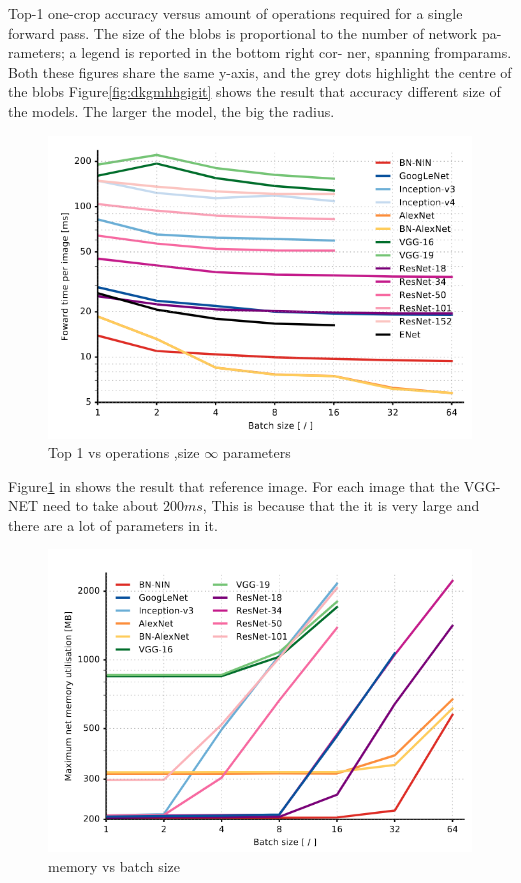 \documentclass[10pt,twocolumn,letterpaper]{article}
\begin{document}
Top-1 one-crop accuracy versus amount of operations
required for a single forward pass.   The size of the
blobs is proportional to the number of network pa-
rameters; a legend is reported in the bottom right cor-
ner, spanning fromparams. Both these figures share the same
y-axis, and the grey dots  highlight the centre of the blobs
Figure\ref{fig:dkgmhhgigit} shows the result that accuracy different size of 
the models. The larger the model, the big the radius.

\begin{figure}[htbp]
	\centering
	\includegraphics[width=0.8\linewidth]{Pic/18.png}
	\caption{Top 1 vs operations ,size $\infty$ parameters }\label{fig:dkgmjklvhhgigit}
\end{figure}

Figure\ref{fig:dkgmjklvhhgigit}  in \cite{canziani2016an} shows the result that reference image. For each image that the VGG-NET need to take about $200ms$, This is because that the it is very large and there are a lot of parameters in it.


\begin{figure}[htbp]
\centering
\includegraphics[width=0.8\linewidth]{Pic/19.png}

\caption{memory vs batch size }

\label{fig:dkgmvfghgghjigit}

\end{figure}
\end{document}
